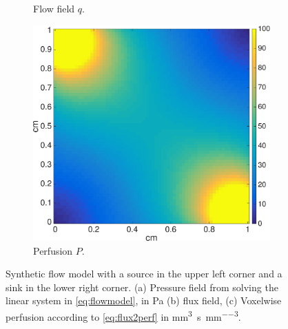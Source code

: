 \documentclass[paper=a4, fontsize=11pt,parskip=half,headings=small]{scrartcl}
\newcommand{\siP}{\cubic\milli\meter\per\second\per\cubic\milli\meter}
\begin{document}
\begin{figure}[H]
\begin{subfigure}[b]{0.3\textwidth}
                \caption{Flow field $q$.}
            \end{subfigure}	           	                     
            \begin{subfigure}[b]{0.3\textwidth}
				\includegraphics[width=\textwidth]{figs/perfusion.eps}
                \caption{Perfusion $P$.}
            \end{subfigure}	                
    	\caption{Synthetic flow model with a source in the upper left corner and a sink in the lower right corner. (a) Pressure field from solving the linear system in \eqref{eq:flowmodel}, in \si{\pascal} (b) flux field, (c) Voxelwise perfusion according to \eqref{eq:flux2perf} in \si{\siP}.}
	        \label{fig:flowpressureperfusion}
	\end{figure}
	
\end{document}
